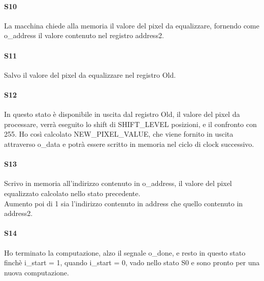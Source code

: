 \paragraph{S10}
La macchina chiede alla memoria il valore del pixel da equalizzare, fornendo come o\_address il valore contenuto nel registro address2.
\paragraph{S11}
Salvo il valore del pixel da equalizzare nel registro Old.
\paragraph{S12}
In questo stato è disponibile in uscita dal registro Old, il valore del pixel da processare, verrà eseguito lo shift di SHIFT\_LEVEL posizioni, e il confronto con 255. Ho così calcolato NEW\_PIXEL\_VALUE, che viene fornito in uscita attraverso o\_data e potrà essere scritto in memoria nel ciclo di clock successivo.
\paragraph{S13}
Scrivo in memoria all'indirizzo contenuto in o\_address, il valore del pixel equalizzato calcolato nello stato precedente.\\
Aumento poi di 1 sia l'indirizzo contenuto in address che quello contenuto in address2.
\paragraph{S14}
Ho terminato la computazione, alzo il segnale o\_done, e resto in questo stato finchè i\_start = 1, quando i\_start = 0, vado nello stato S0 e sono pronto per una nuova computazione.
